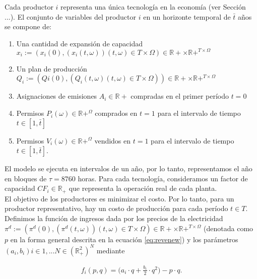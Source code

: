  Cada productor $i$ representa una única tecnología en la economía (ver Sección ...). El conjunto de variables del productor $i$ en un horizonte temporal de $\bar{t}$ años se compone de: 
 \begin{enumerate}

\item 
Una cantidad de expansión de capacidad $x_i:=\left(x_i(0),(x_i(t,\omega)){(t,\omega)\in T\times\Omega}\right)\in\mathbb{R}+\times\mathbb{R}+^{T\times\Omega}$
 \item 
 Un plan de producción $Q_i:=\left(Q{i}(0),(Q_{i}(t,\omega){(t,\omega)\in T\times\Omega})\right)\in\mathbb{R}+\times\mathbb{R}+^{T\times\Omega}$
 \item 
 Asignaciones de emisiones $A_i\in\mathbb{R}+$ compradas en el primer período $t=0$
 \item 
 Permisos $P_i(\omega)\in\mathbb{R}+^{\Omega}$ comprados en $t=1$ para el intervalo de tiempo $t\in[1,\bar{t}]$
 \item 
 Permisos $V_i(\omega)\in\mathbb{R}+^{\Omega}$ vendidos en $t=1$ para el intervalo de tiempo $t\in[1,\bar{t}]$.

\end{enumerate}
El modelo se ejecuta en intervalos de un año, por lo tanto, representamos el año en bloques de $\tau=8760$ horas. Para cada tecnología, consideramos un factor de capacidad $CF_i\in\mathbb{R}_+$ que representa la operación real de cada planta.\\

El objetivo de los productores es minimizar el costo. Por lo tanto, para un productor representativo, hay un costo de producción para cada período $t\in T$. Definimos la función de ingresos dada por los precios de la electricidad $\pi^d:=\left(\pi^d(0),\left(\pi^d(t,\omega)\right){(t,\omega)\in T\times\Omega}\right)\in\mathbb{R}+\times\mathbb{R}+^{T\times\Omega}$ (denotada como $p$ en la forma general descrita en la ecuación \ref{eq:revenew}) y los parámetros $(a_i,b_i){i\in{1,...N}}\in(\mathbb{R}^2_+)^N$ mediante

\begin{align}\label{eq:revenew}
f_i(p,q)=\Big(a_i\cdot q+\frac{b_i}{2}\cdot q^{2}\Big)-p\cdot q.
\end{align}\\

